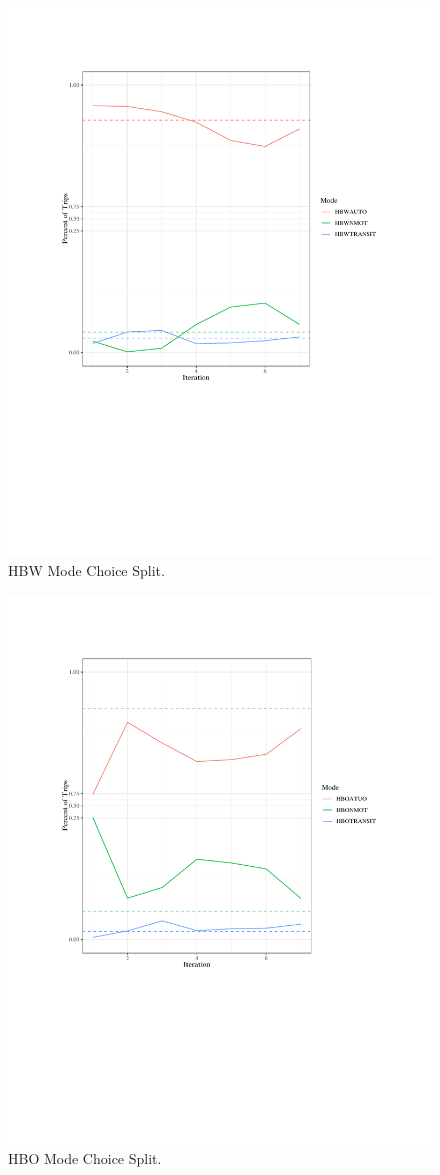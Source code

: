   \begin{figure}

  {\centering \includegraphics[width=0.75\linewidth]{figures/chapter3/hbw_mc.pdf}

  }

  \caption{HBW Mode Choice Split.}\label{fig:hbwmc}
  \end{figure}

  \begin{figure}

  {\centering \includegraphics[width=0.75\linewidth]{figures/chapter3/hbo_mc.pdf}

  }

  \caption{HBO Mode Choice Split.}\label{fig:hbomc}
  \end{figure}

